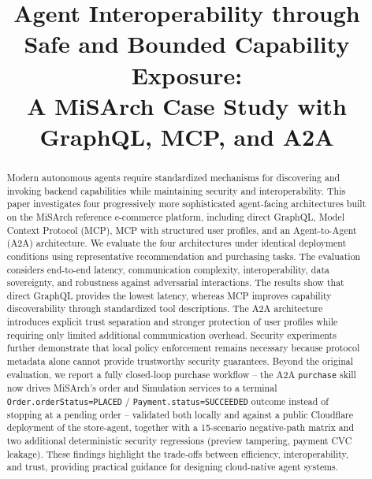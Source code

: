 \documentclass[conference]{IEEEtran}
\begin{document}
\title{Agent Interoperability through Safe and Bounded Capability Exposure:\\
A MiSArch Case Study with GraphQL, MCP, and A2A}

\author{
}

\maketitle

\begin{abstract}
Modern autonomous agents require standardized mechanisms for discovering and
invoking backend capabilities while maintaining security and interoperability.
This paper investigates four progressively more sophisticated agent-facing
architectures built on the MiSArch reference e-commerce platform, including
direct GraphQL, Model Context Protocol (MCP), MCP with structured user
profiles, and an Agent-to-Agent (A2A) architecture.
We evaluate the four architectures under identical deployment conditions using
representative recommendation and purchasing tasks. The evaluation considers
end-to-end latency, communication complexity, interoperability, data
sovereignty, and robustness against adversarial interactions.
The results show that direct GraphQL provides the lowest latency, whereas MCP
improves capability discoverability through standardized tool descriptions.
The A2A architecture introduces explicit trust separation and stronger
protection of user profiles while requiring only limited additional
communication overhead.
Security experiments further demonstrate that local policy enforcement
remains necessary because protocol metadata alone cannot provide trustworthy
security guarantees.
Beyond the original evaluation, we report a fully closed-loop purchase
workflow -- the A2A \texttt{purchase} skill now drives MiSArch's order and
Simulation services to a terminal \texttt{Order.orderStatus=PLACED} /
\texttt{Payment.status=SUCCEEDED} outcome instead of stopping at a pending
order -- validated both locally and against a public Cloudflare deployment of
the store-agent, together with a 15-scenario negative-path matrix and two
additional deterministic security regressions (preview tampering, payment CVC
leakage). These findings highlight the trade-offs between efficiency,
interoperability, and trust, providing practical guidance for designing
cloud-native agent systems.
\end{abstract}
\end{document}
